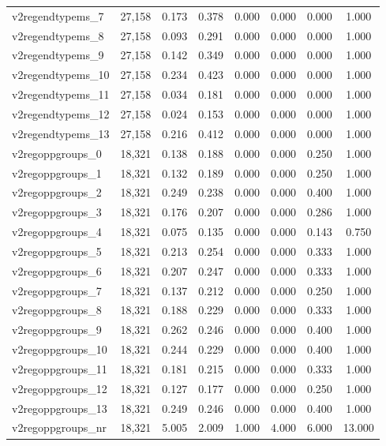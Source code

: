 \begin{table}[!htbp]
\begin{tabular}{@{\extracolsep{5pt}}lccccccc}
v2regendtypems\_7 & 27,158 & 0.173 & 0.378 & 0.000 & 0.000 & 0.000 & 1.000 \\ 
v2regendtypems\_8 & 27,158 & 0.093 & 0.291 & 0.000 & 0.000 & 0.000 & 1.000 \\ 
v2regendtypems\_9 & 27,158 & 0.142 & 0.349 & 0.000 & 0.000 & 0.000 & 1.000 \\ 
v2regendtypems\_10 & 27,158 & 0.234 & 0.423 & 0.000 & 0.000 & 0.000 & 1.000 \\ 
v2regendtypems\_11 & 27,158 & 0.034 & 0.181 & 0.000 & 0.000 & 0.000 & 1.000 \\ 
v2regendtypems\_12 & 27,158 & 0.024 & 0.153 & 0.000 & 0.000 & 0.000 & 1.000 \\ 
v2regendtypems\_13 & 27,158 & 0.216 & 0.412 & 0.000 & 0.000 & 0.000 & 1.000 \\ 
v2regoppgroups\_0 & 18,321 & 0.138 & 0.188 & 0.000 & 0.000 & 0.250 & 1.000 \\ 
v2regoppgroups\_1 & 18,321 & 0.132 & 0.189 & 0.000 & 0.000 & 0.250 & 1.000 \\ 
v2regoppgroups\_2 & 18,321 & 0.249 & 0.238 & 0.000 & 0.000 & 0.400 & 1.000 \\ 
v2regoppgroups\_3 & 18,321 & 0.176 & 0.207 & 0.000 & 0.000 & 0.286 & 1.000 \\ 
v2regoppgroups\_4 & 18,321 & 0.075 & 0.135 & 0.000 & 0.000 & 0.143 & 0.750 \\ 
v2regoppgroups\_5 & 18,321 & 0.213 & 0.254 & 0.000 & 0.000 & 0.333 & 1.000 \\ 
v2regoppgroups\_6 & 18,321 & 0.207 & 0.247 & 0.000 & 0.000 & 0.333 & 1.000 \\ 
v2regoppgroups\_7 & 18,321 & 0.137 & 0.212 & 0.000 & 0.000 & 0.250 & 1.000 \\ 
v2regoppgroups\_8 & 18,321 & 0.188 & 0.229 & 0.000 & 0.000 & 0.333 & 1.000 \\ 
v2regoppgroups\_9 & 18,321 & 0.262 & 0.246 & 0.000 & 0.000 & 0.400 & 1.000 \\ 
v2regoppgroups\_10 & 18,321 & 0.244 & 0.229 & 0.000 & 0.000 & 0.400 & 1.000 \\ 
v2regoppgroups\_11 & 18,321 & 0.181 & 0.215 & 0.000 & 0.000 & 0.333 & 1.000 \\ 
v2regoppgroups\_12 & 18,321 & 0.127 & 0.177 & 0.000 & 0.000 & 0.250 & 1.000 \\ 
v2regoppgroups\_13 & 18,321 & 0.249 & 0.246 & 0.000 & 0.000 & 0.400 & 1.000 \\ 
v2regoppgroups\_nr & 18,321 & 5.005 & 2.009 & 1.000 & 4.000 & 6.000 & 13.000 \\ 

\end{tabular}
\end{table}

